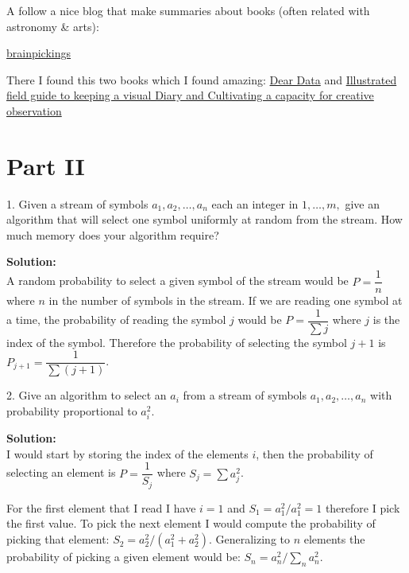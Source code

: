 \documentclass[14pt]{article}
\begin{document}
\begin{enumerate}
A follow a nice blog that make summaries about books (often related
with astronomy \& arts):

\href{https://www.brainpickings.org}{brainpickings}

There I found this two books which I found amazing:
\href{https://www.brainpickings.org/2015/03/19/dear-data-giorgia-lupi-stefanie-posavec/}{Dear
Data} and \href{https://www.brainpickings.org/2014/12/02/lynda-barry-syllabus-book/}{Illustrated
field guide to keeping a visual Diary and Cultivating a capacity for creative observation}

\end{enumerate}

\newpage{}

\section{Part II}

\begin{mdframed}
1. Given a stream of symbols $a_1,a_2,…,a_n$ each an integer in
$1,…,m,$ give an algorithm that will select one symbol uniformly
 at random from the stream. How much memory does your algorithm require?
\end{mdframed}

\textbf{Solution:}\\

A random probability to select a given symbol of the stream
would be $P = \dfrac{1}{n}$ where $n$ in the number of symbols in the
stream. If we are reading one symbol at a time, the probability of
reading the symbol $j$ would
be $P = \dfrac{1}{\sum j}$ where $j$ is the index of the symbol. Therefore 
the probability of selecting the symbol $j+1$ is $P_{j+1} =
\dfrac{1}{\sum (j+1)}$.\\


\begin{mdframed}
2. Give an algorithm to select an $a_i$ from a stream of symbols
$a_1,a_2,…,a_n$ with probability proportional to $a^2_i$.\\
\end{mdframed}

\textbf{Solution:}\\

I would start by storing the index of the elements $i$, then the
probability of selecting an element is $P = \dfrac{1}{S_{j}}$ where
$S_j = \sum a_j^2$.

For the first element that I read I have $i=1$ and $S_1 =
a_1^2/a_1^2=1$ therefore I pick the first value.
To pick the next element I would compute the probability of picking that
element: $S_2 = a_2^2/(a_1^2 + a_2^2)$. Generalizing to $n$ elements
the probability of picking a given element would be: $S_n = a_n^2 /
\sum_n a_{n}^2$.
\end{document}
